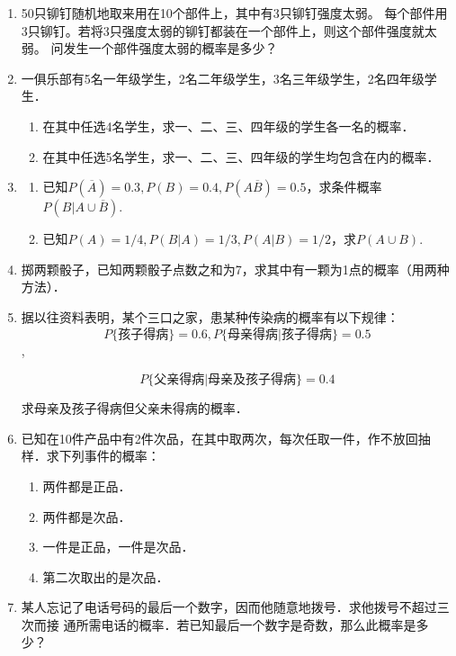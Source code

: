 \begin{enumerate}
    \item 50只铆钉随机地取来用在10个部件上，其中有3只铆钉强度太弱。
    每个部件用3只铆钉。若将3只强度太弱的铆钉都装在一个部件上，则这个部件强度就太弱。
    问发生一个部件强度太弱的概率是多少？


    \item 一俱乐部有5名一年级学生，2名二年级学生，3名三年级学生，2名四年级学生．
    \begin{enumerate}
        \item 在其中任选4名学生，求一、二、三、四年级的学生各一名的概率．
        \item 在其中任选5名学生，求一、二、三、四年级的学生均包含在内的概率．
    \end{enumerate}


    \item \begin{enumerate}
        \item 已知$P(\overline{A})=0.3,P(B)=0.4,P(A\overline{B})=0.5$，求条件概率$P(B|A\cup \overline{B})$.
        \item 已知$P(A)=1/4,P(B|A)=1/3,P(A|B)=1/2$，求$P(A\cup B)$.
    \end{enumerate}



    \item 掷两颗骰子，已知两颗骰子点数之和为7，求其中有一颗为1点的概率（用两种方法）．


    \item 据以往资料表明，某个三口之家，患某种传染病的概率有以下规律：
    $$P\{\mbox{孩子得病}\}=0.6,P\{\mbox{母亲得病}|\mbox{孩子得病}\}=0.5$$,
    
    $$P\{\mbox{父亲得病}|\mbox{母亲及孩子得病}\}=0.4$$
    
    求母亲及孩子得病但父亲未得病的概率．


    \item 已知在10件产品中有2件次品，在其中取两次，每次任取一件，作不放回抽样．求下列事件的概率：
    \begin{enumerate}
        \item 两件都是正品．
        \item 两件都是次品．
        \item 一件是正品，一件是次品．
        \item 第二次取出的是次品．
    \end{enumerate}


    \item 某人忘记了电话号码的最后一个数字，因而他随意地拨号．求他拨号不超过三次而接
    通所需电话的概率．若已知最后一个数字是奇数，那么此概率是多少？



\end{enumerate}
